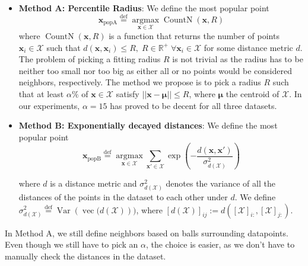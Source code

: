 \begin{itemize}
    \item \textbf{Method A: Percentile Radius}: We define the most popular point
    \begin{equation}
        \mathbf{x}_\mathrm{popA} \stackrel{\mathrm{def}}{=} \underset{\mathbf{x}\in\mathcal{X}}{\operatorname{argmax}}\operatorname{CountN}\left(\mathbf{x}, R\right)
    \end{equation}where $\operatorname{CountN}(\mathbf{x}, R)$ is a function that returns the number of points $\mathbf{x}_i\in\mathcal{X}$ such that $d(\mathbf{x}, \mathbf{x}_i) \leq R, \;R\in\mathbb{R^+}\;\forall \mathbf{x}_i \in \mathcal{X}$ for some distance metric $d$. The problem of picking a fitting radius $R$ is not trivial as the radius has to be neither too small nor too big as either all or no points would be considered neighbors, respectively. The method we propose is to pick a radius $R$ such that at least $\alpha\%$ of $\mathbf{x}\in \mathcal{X}$ satisfy $||\mathbf{x} - \boldsymbol{\mu}|| \leq R$, where $\boldsymbol{\mu}$ the centroid of $\mathcal{X}$. In our experiments, $\alpha=15$ has proved to be decent for all three datasets.
    \item \textbf{Method B: Exponentially decayed distances}:
    We define the most popular point
    \begin{equation}
        \mathbf{x}_{\mathrm{popB}} \stackrel{\mathrm{def}}{=} \underset{\mathbf{x}\in\mathcal{X}}{\operatorname{argmax}} \displaystyle\sum_{\mathbf{x}'\in\mathcal{X}} \exp\left(-\frac{d(\mathbf{x}, \mathbf{x}')}{\sigma^2_{d(\mathcal{X})}}\right)
    \end{equation}

    where $d$ is a distance metric and $\sigma^2_{d(\mathcal{X})}$ denotes the variance of all the distances of the points in the dataset to each other under $d$. We define $\sigma_{d(\mathcal{X})}^2\stackrel{\mathrm{def}}{=}\operatorname{Var}\left(\operatorname{vec}(d(\mathcal{X})\right))$, where  $\left[d(\mathcal{X})\right]_{i j}:=d\left(\left[\mathcal{X}\right]_{i :}, \left[\mathcal{X}\right]_{j :}\right)$.
\end{itemize}

In Method A, we still define neighbors based on balls surrounding datapoints. Even though we still have to pick an $\alpha$, the choice is easier, as we don't have to manually check the distances in the dataset.

